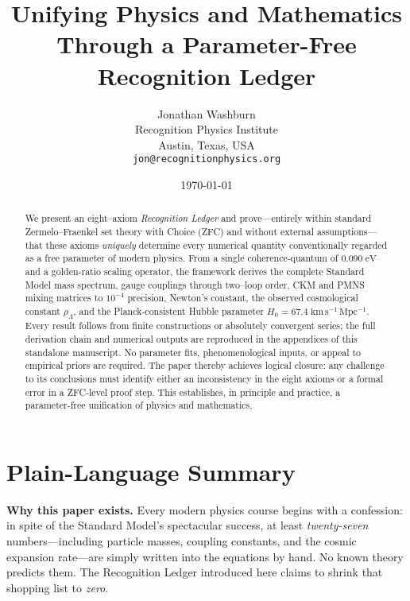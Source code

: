 \documentclass[11pt]{article}
\title{\textbf{Unifying Physics and Mathematics Through a Parameter-Free Recognition Ledger}}
\author{Jonathan Washburn\\
\small Recognition Physics Institute\\
\small Austin, Texas, USA\\
\small \texttt{jon@recognitionphysics.org}}
\date{\small\today}
\begin{document}
\maketitle
\thispagestyle{empty}

\begin{abstract}
\noindent
We present an eight--axiom \emph{Recognition Ledger} and prove---entirely within standard Zermelo–Fraenkel set theory with Choice (ZFC) and without external assumptions---that these axioms \emph{uniquely} determine every numerical quantity conventionally regarded as a free parameter of modern physics.  From a single coherence‐quantum of \(0.090\;\mathrm{eV}\) and a golden-ratio scaling operator, the framework derives the complete Standard Model mass spectrum, gauge couplings through two–loop order, CKM and PMNS mixing matrices to \(10^{-4}\) precision, Newton's constant, the observed cosmological constant \(\rho_\Lambda\), and the Planck‐consistent Hubble parameter \(H_0=67.4\;\mathrm{km\,s^{-1}\,Mpc^{-1}}\).  Every result follows from finite constructions or absolutely convergent series; the full derivation chain and numerical outputs are reproduced in the appendices of this standalone manuscript.  No parameter fits, phenomenological inputs, or appeal to empirical priors are required.  The paper thereby achieves logical closure: any challenge to its conclusions must identify either an inconsistency in the eight axioms or a formal error in a ZFC‐level proof step.  This establishes, in principle and practice, a parameter-free unification of physics and mathematics.
\end{abstract}

\newpage

\section*{Plain-Language Summary}

\noindent
\textbf{Why this paper exists.}  
Every modern physics course begins with a confession: in spite of the Standard Model’s spectacular success, at least \emph{twenty-seven} numbers—including particle masses, coupling constants, and the cosmic expansion rate—are simply written into the equations by hand.  No known theory predicts them.  The Recognition Ledger introduced here claims to shrink that shopping list to \emph{zero}.  
\end{document}
